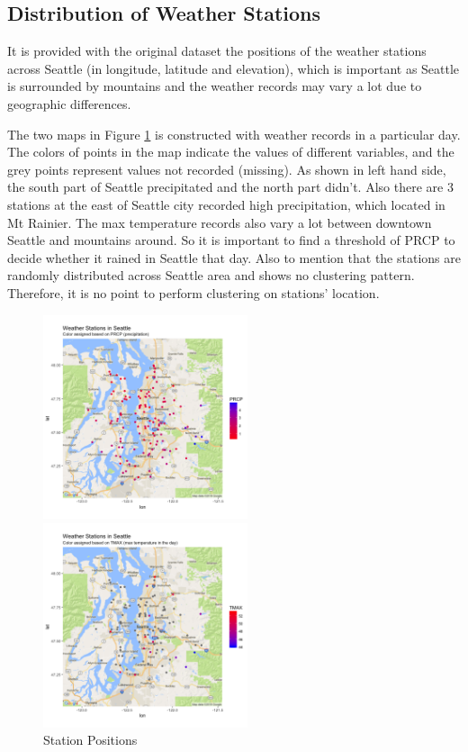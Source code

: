 \subsection{Distribution of Weather Stations}

It is provided with the original dataset the positions of the weather stations across Seattle (in longitude, latitude and elevation), which is important as Seattle is surrounded by mountains and the weather records may vary a lot due to geographic differences.

The two maps in Figure \ref{pos} is constructed with weather records in a particular day. The colors of points in the map indicate the values of different variables, and the grey points represent values not recorded (missing). As shown in left hand side, the south part of Seattle precipitated and the north part didn't. Also there are 3 stations at the east of Seattle city recorded high precipitation, which located in Mt Rainier. The max temperature records also vary a lot between downtown Seattle and mountains around. So it is important to find a threshold of PRCP to decide whether it rained in Seattle that day. Also to mention that the stations are randomly distributed across Seattle area and shows no clustering pattern. Therefore, it is no point to perform clustering on stations' location.

\begin{figure}[h]
\centering
\begin{minipage}[t]{0.48\textwidth}
\centering
\includegraphics[width=6cm]{station1.png}
\end{minipage}
\begin{minipage}[t]{0.48\textwidth}
\centering
\includegraphics[width=6cm]{station2.png}
\end{minipage}
\caption{Station Positions}
\label{pos}
\end{figure}